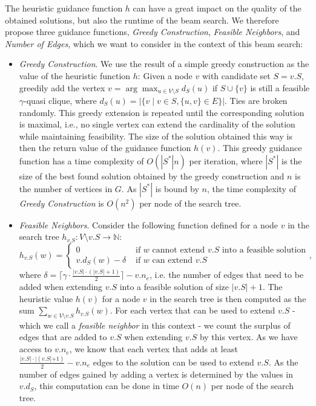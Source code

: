 \documentclass[draft,final]{vutinfth} %
\begin{document}
The heuristic guidance function $h$ can have a great impact on the quality of the obtained solutions, but also the runtime of the beam search. We therefore propose three guidance functions, \emph{Greedy Construction}, \emph{Feasible Neighbors}, and \emph{Number of Edges}, which we want to consider in the context of this beam search: 
\begin{itemize}
    \item \emph{Greedy Construction}. We use the result of a simple greedy construction as the value of the heuristic function $h$: Given a node $v$ with candidate set $S = v.S$, greedily add the vertex $v = \arg \max_{u \in V \setminus S} d_S(u)$ if $S \cup \{v\}$ is still a feasible $\gamma$-quasi clique, where $d_S(u) = |\{v \mid v \in S, \{u,v\} \in E \}|$. 
    Ties are broken randomly. This greedy extension is repeated until the corresponding solution is maximal, i.e., no single vertex can extend the cardinality of the solution while maintaining feasibility. 
    The size of the solution obtained this way is then the return value of the guidance function $h(v)$. This greedy guidance function has a time complexity of $O(|S^*|n)$ per iteration, where $|S^*|$ is the size of the best found solution obtained by the greedy construction and $n$ is the number of vertices in $G$. As $|S^*|$ is bound by $n$, the time complexity of \emph{Greedy Construction} is $O(n^2)$ per node of the search tree. 
    \item \emph{Feasible Neighbors}. Consider the following function defined for a node $v$ in the search tree $h_{v.S} \colon V \setminus v.S \rightarrow \mathbb{N}$: 
    \[
        h_{v.S}(w) = 
        \begin{cases}
            0 & \text{ if $w$ cannot extend $v.S$ into a feasible solution}\\
            \mathit{v.d_S}(w) - \delta & \text{ if $w$ can extend $v.S$ }
        \end{cases},
    \]
    where $\delta = \lceil \gamma \cdot \frac{|v.S|\cdot (|v.S|+1)}{2} \rceil - v.n_e$, i.e. the number of edges that need to be added when extending $v.S$ into a feasible solution of size $|v.S|+1$. 
    The heuristic value $h(v)$ for a node $v$ in the search tree is then computed as the sum $\sum_{w \in V \setminus v.S} h_{v.S}(w)$. 
    For each vertex that can be used to extend $v.S$ - which we call a \emph{feasible neighbor} in this context - we count the surplus of edges that are added to $v.S$ when extending $v.S$ by this vertex. As we have access to $v.n_e$, we know that each vertex that adds at least $\frac{|v.S|\cdot|(v.S|+1)}{2} - v.n_e$ edges to the solution can be used to extend $v.S$. As the number of edges gained by adding a vertex is determined by the values in $v.d_S$, this computation can be done in time $O(n)$ per node of the search tree. 

\end{itemize}
\end{document}
